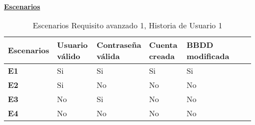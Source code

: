 \documentclass[../ei103948-project-documentation.tex]{subfiles}
\begin{document}
				\begin{center}
					\textbf{\underline{Escenarios}}
					\begin{table}[H]
						\centering
						\begin{tabular}{|p{0.14\linewidth}|p{0.20\linewidth}|p{0.20\linewidth}|p{0.20\linewidth}|p{0.12\linewidth}|p{0.12\linewidth}|p{0.12\linewidth}|}
							\hline
							\textbf{Escenarios} & \textbf{Usuario válido} & \textbf{Contraseña válida} & \textbf{Cuenta creada} & \textbf{BBDD modificada} \\ \hline
							\textbf{E1}         & Si                      & Si                         & Si                     & Si                       \\ \hline
							\textbf{E2}         & Si                      & No                         & No                     & No                       \\ \hline
							\textbf{E3}         & No                      & Si                         & No                     & No                       \\ \hline
							\textbf{E4}                  & No                      & No                         & No                     & No                       \\ \hline
							\end{tabular}
						\caption{Escenarios Requisito avanzado 1, Historia de Usuario 1}
					\end{table}

					\descripcionAvanzadaA

					\newpage


\end{center}
\end{document}
